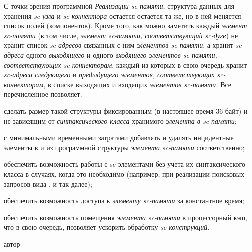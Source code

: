 \begin{SCn}
\begin{scnsubstruct}
\begin{scnsubstruct}
\begin{scnsubstruct}
{		С точки зрения программной \textit{Реализации sc-памяти}, структура данных для хранения \textit{sc-узла} и \textit{sc-коннектора} остается остается та же, но в ней меняется список полей (компонентов). Кроме того, как можно заметить каждый \textit{элемент sc-памяти} (в том числе, \textit{элемент sc-памяти, соответствующий sc-дуге}) не хранит список \textit{sc-адресов} связанных с ним \textit{элементов sc-памяти}, а хранит \textit{sc-адреса} одного \textit{выходящего} и одного \textit{входящего элементов sc-памяти, соответствующих sc-коннекторам}, каждый из которых в свою очередь хранит \textit{sc-адреса следующего} и \textit{предыдущего элементов, соответствующих sc-коннекторам}, в списке выходящих и входящих \textit{элементов sc-памяти.} Все перечисленное позволяет:
		\begin{scnitemize}
			\item сделать размер такой структуры фиксированным (в настоящее время 36 байт) и не зависящим от \textit{синтаксического класса} хранимого \textit{элемента в sc-памяти\scnsupergroupsign};
			\item с минимальными временными затратами добавлять и удалять инцидентные элементы в и из программной структуры \textit{элемента sc-памяти} соответственно;
			\item обеспечить возможность работы с sc-элементами без учета их синтаксического класса в случаях, когда это необходимо (например, при реализации поисковых запросов вида ,  и так далее);
			\item обеспечить возможность доступа к \textit{элементу sc-памяти} за константное время;
			\item обеспечить возможность помещения \textit{элемента sc-памяти} в процессорный кэш, что в свою очередь, позволяет ускорить обработку \textit{sc-конструкций}.
		\end{scnitemize}
	}

	\begin{scnsubstruct}
	\begin{scnrelfromlist}{автор}
	\end{scnrelfromlist}
\end{scnsubstruct}
\end{scnsubstruct}
\end{scnsubstruct}
\end{scnsubstruct}
\end{SCn}
